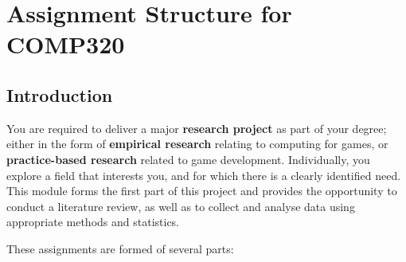 \chapter{Assignment Structure for COMP320}

\section*{Introduction}

You are required to deliver a major \textbf{research project} as part of your degree; either in the form of \textbf{empirical research} relating to computing for games, or \textbf{practice-based research} related to game development. Individually, you explore a field that interests you, and for which there is a clearly identified need. This module forms the first part of this project and provides the opportunity to conduct a literature review, as well as to collect and analyse data using appropriate methods and statistics.

These assignments are formed of several parts:


